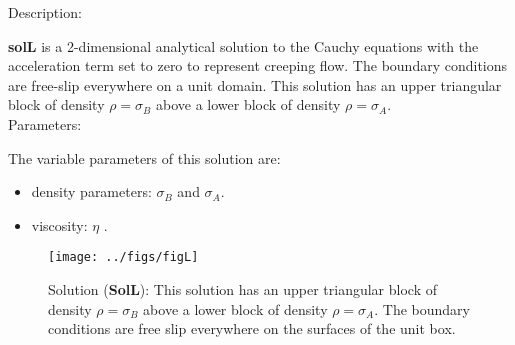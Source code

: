   {\large \fontB Description:}
  
  {\bf solL} is a 2-dimensional analytical solution to the Cauchy equations with the acceleration term set to zero
  to represent creeping flow. The boundary conditions are free-slip everywhere on a unit domain. 
  This solution has an upper triangular block of density $\rho = \sigma_B$ above
      a lower block of density $\rho = \sigma_A$.
  \\

  {\large \fontB Parameters:}
 
  The variable parameters of this solution are:
  \begin{itemize}
    \item{density parameters: $ \sigma_B $ and $ \sigma_A $.}
    \item{viscosity: $\eta$ .}
    \end{itemize}

  \begin{SCfigure}[][h]
    \texttt{[image: ../figs/figL]}
    \caption[Short caption]{\label{figL} 
      Solution ({\bf SolL}):
      This solution has an upper triangular block of density $\rho = \sigma_B$ above
      a lower block of density $\rho = \sigma_A$.
      The boundary conditions are free slip everywhere on the surfaces of the unit box.}
  \end{SCfigure} 
  


